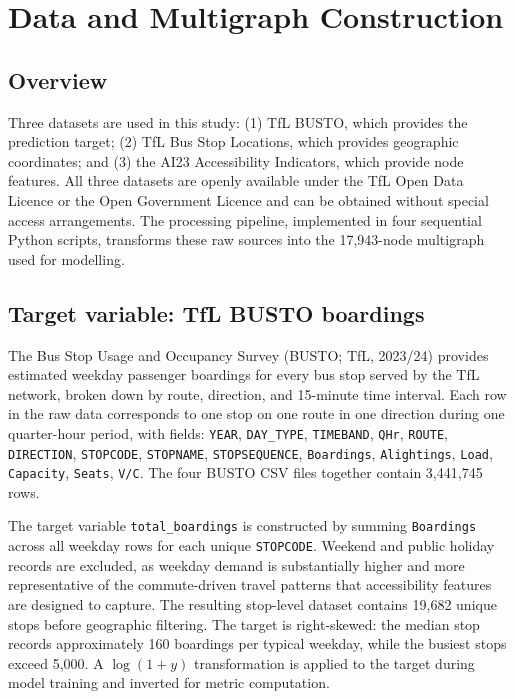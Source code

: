 \documentclass[12pt,a4paper]{report}
\begin{document}
\chapter{Data and Multigraph Construction}
\label{ch:data}

\section{Overview}
Three datasets are used in this study: (1) TfL BUSTO, which provides the
prediction target; (2) TfL Bus Stop Locations, which provides geographic
coordinates; and (3) the AI23 Accessibility Indicators, which provide node
features. All three datasets are openly available under the TfL Open Data
Licence or the Open Government Licence and can be obtained without special
access arrangements. The processing pipeline, implemented in four sequential
Python scripts, transforms these raw sources into the 17,943-node multigraph
used for modelling.

\section{Target variable: TfL BUSTO boardings}
The Bus Stop Usage and Occupancy Survey (BUSTO; TfL, 2023/24) provides
estimated weekday passenger boardings for every bus stop served by the TfL
network, broken down by route, direction, and 15-minute time interval. Each
row in the raw data corresponds to one stop on one route in one direction
during one quarter-hour period, with fields: \texttt{YEAR}, \texttt{DAY\_TYPE},
\texttt{TIMEBAND}, \texttt{QHr}, \texttt{ROUTE}, \texttt{DIRECTION},
\texttt{STOPCODE}, \texttt{STOPNAME}, \texttt{STOPSEQUENCE},
\texttt{Boardings}, \texttt{Alightings}, \texttt{Load}, \texttt{Capacity},
\texttt{Seats}, \texttt{V/C}. The four BUSTO CSV files together contain
3,441,745 rows.

The target variable \texttt{total\_boardings} is constructed by summing
\texttt{Boardings} across all weekday rows for each unique \texttt{STOPCODE}.
Weekend and public holiday records are excluded, as weekday demand is
substantially higher and more representative of the commute-driven travel
patterns that accessibility features are designed to capture. The resulting
stop-level dataset contains 19,682 unique stops before geographic filtering.
The target is right-skewed: the median stop records approximately 160 boardings
per typical weekday, while the busiest stops exceed 5,000. A $\log(1 + y)$
transformation is applied to the target during model training and inverted for
metric computation.
\end{document}
